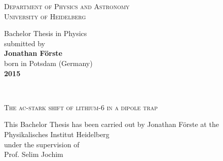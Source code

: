 \pagestyle{empty}

\begin{titlepage}
\begin{center}
 
\Large\textsc{Department of Physics and Astronomy\\
University of Heidelberg}

\vspace{15.5cm}

\normalsize
Bachelor Thesis in Physics\\
submitted by\\
\vspace{0.5cm}
\Large\textbf{Jonathan Förste}\\
\normalsize
\vspace{0.5cm}
born in Potsdam (Germany)\\
\vspace{0.5cm}
\Large\textbf{2015}
\normalsize

\newpage
\ 
\newpage




\Large\textsc{The ac-stark shift of lithium-6 in a dipole trap}

\vspace{18cm}

\normalsize
This Bachelor Thesis has been carried out by Jonathan Förste at the\\
Physikalisches Institut Heidelberg\\
under the supervision of\\
Prof. Selim Jochim

\vfill
\end{center}

\end{titlepage}
\newpage
\ 

\pagestyle{headings}

